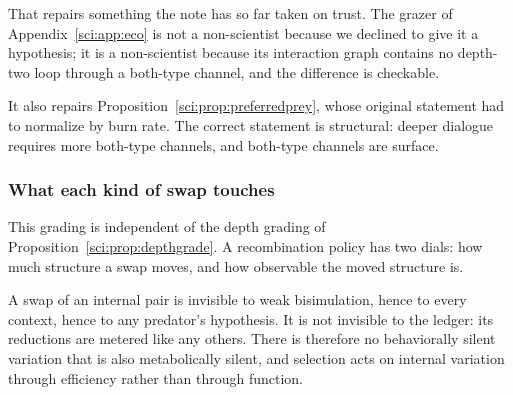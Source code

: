 That repairs something the note has so far taken on trust. The grazer of Appendix~\ref{sci:app:eco} is not
a non-scientist because we declined to give it a hypothesis; it is a non-scientist because its
interaction graph contains no depth-two loop through a both-type channel, and the difference is
checkable.

It also repairs Proposition~\ref{sci:prop:preferredprey}, whose original statement had to normalize by
burn rate. The correct statement is structural: deeper dialogue requires more both-type channels,
and both-type channels are surface.

\subsubsection*{What each kind of swap touches}

\begin{table}[h]
\centering
{}
\caption{The classification says which discipline applies where. Only internal and both-type channels
host pairs at all; external material consists of primes whose counterpart lies in the environment, so
it is swappable singly without orphaning anything --- at the price that its viability is a bet about
the environment rather than a fact about the genome.}
\label{sci:tab:swaptypes}
\end{table}

This grading is independent of the depth grading of Proposition~\ref{sci:prop:depthgrade}. A recombination
policy has two dials: how much structure a swap moves, and how observable the moved structure is.

\begin{proposition}
\label{sci:prop:noneutral}
A swap of an internal pair is invisible to weak bisimulation, hence to every context, hence to any
predator's hypothesis. It is not invisible to the ledger: its reductions are metered like any others.
There is therefore no behaviorally silent variation that is also metabolically silent, and selection
acts on internal variation through efficiency rather than through function.
\end{proposition}

